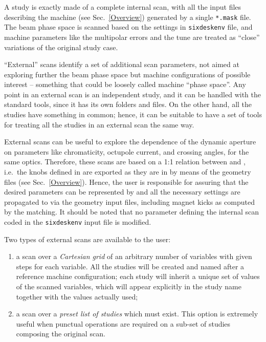 A \SIXDESK{} study is exactly made of a complete internal scan, with all the
\SIXTRACK{} input files describing the machine (see Sec.~\ref{Overview})
generated by a single \texttt{*.mask} file. The beam phase space is scanned
based on the settings in \texttt{sixdeskenv} file, and machine parameters like
the multipolar errors and the tune are treated as ``close'' variations of the
original study case.

``External'' scans identify a set of additional scan parameters, not aimed at
exploring further the beam phase space but machine configurations of possible
interest -- something that could be loosely called machine ``phase space''.
Any point in
an external scan is an independent \SIXDESK{} study, and it can be handled
with the standard tools, since it has its own folders and files.
On the other hand, all the studies have something in common; hence,
it can be suitable to have a set of tools for treating all the
studies in an external scan the same way.

External scans can be useful to explore the dependence of the dynamic
aperture on parameters like chromaticity, octupole current, and crossing
angles, for the same optics. Therefore,
these scans are based on a 1:1 relation between \MADX{} and
\SIXTRACK{}, i.e.~the knobs defined in \MADX{} are exported as they
are in \SIXTRACK{} by means of the geometry files (see Sec.~\ref{Overview}).
Hence, the user is responsible for assuring that the desired parameters can be
represented by \MADX{} and all the necessary settings are propagated
to \SIXTRACK{} via the geometry input files,
including magnet kicks as computed by the \MADX{} matching.
It should be noted that no parameter defining the internal scan
coded in the \texttt{sixdeskenv} input file is modified.

Two types of external scans are available to the user:
\begin{enumerate}
\item a scan over a \emph{Cartesian grid} of an arbitrary number
  of variables with given steps for each variable. All the studies
  will be created and named after a reference machine configuration;
  each study will inherit a unique set of values of the scanned variables,
  which will appear explicitly in the study name
  together with the values actually used;
\item a scan over a \emph{preset list of studies} which must exist.
  This option is extremely useful when punctual operations are
  required on a sub-set of studies composing the original scan.
\end{enumerate}

